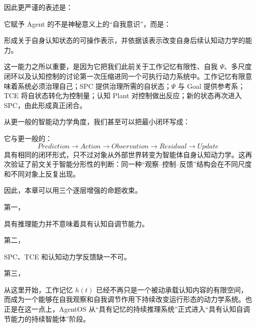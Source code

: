 因此更严谨的表述是：
\begin{statementbox}
\centering
{}
\end{statementbox}

它赋予 Agent 的不是神秘意义上的``自我意识''，而是：
\begin{statementbox}
形成关于自身认知状态的可操作表示，并依据该表示改变自身后续认知动力学的能力。
\end{statementbox}

这一能力之所以重要，是因为它把我们此前关于工作记忆有限性、自我 $\Psi$、多尺度闭环以及认知控制的讨论第一次压缩进同一个可执行动力系统中。工作记忆有限意味着系统必须治理自己；SPC 提供治理所需的自状态；$\Psi$ 与 Goal 提供参考系；TCE 将自状态转化为控制量；认知 Plant 对控制做出反应；新的状态再次进入 SPC，由此形成真正闭合。

从更一般的智能动力学角度，我们甚至可以把最小闭环写成：
\begin{statementbox}
\centering
{}
\end{statementbox}
它与更一般的：
\begin{equation}
Prediction
\rightarrow
Action
\rightarrow
Observation
\rightarrow
Residual
\rightarrow
Update
\end{equation}
具有相同的闭环形式，只不过对象从外部世界转变为智能体自身认知动力学。这再次验证了前文关于智能分形性的判断：同一种``观察--控制--反馈''结构会在不同尺度和不同对象上反复出现。

因此，本章可以用三个逐层增强的命题收束。

第一，
\begin{statementbox}
\centering
{}
\end{statementbox}
具有推理能力并不意味着具有认知自调节能力。

第二，
\begin{statementbox}
\centering
{}
\end{statementbox}
SPC、TCE 和认知动力学反馈缺一不可。

第三，
\begin{statementbox}
\centering
{}
\end{statementbox}

从这里开始，工作记忆 $h(t)$ 已经不再只是一个被动承载认知内容的有限空间，而成为一个能够在自我观察和自我调节作用下持续改变运行形态的动力学系统。也正是在这一点上，AgentOS 从``具有记忆的持续推理系统''正式进入``具有认知自调节能力的持续智能体''阶段。
